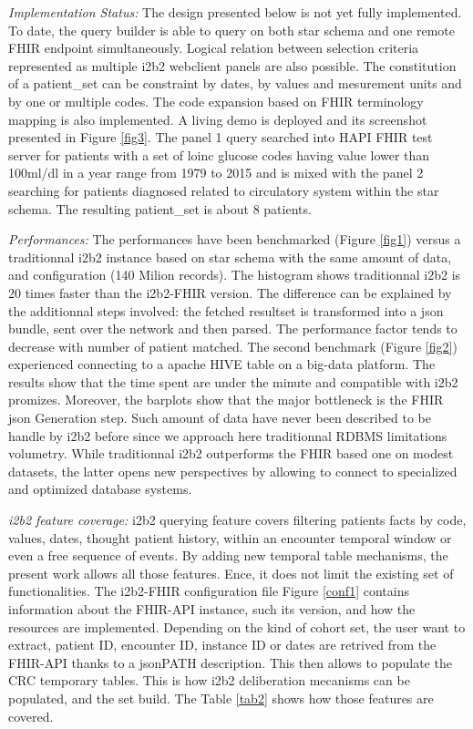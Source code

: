 \documentclass{amia}
\begin{document}
\textit{Implementation Status: } The design presented below is not yet fully implemented. To date, the query builder is able to query on both star schema and one remote FHIR endpoint simultaneously. Logical relation between selection criteria represented as multiple i2b2 webclient panels are also possible. The constitution of a patient\_set can be constraint by dates, by values and mesurement units and by one or multiple codes. The code expansion based on FHIR terminology mapping is also implemented. A living demo is deployed\cite{ref16}  and its screenshot presented in Figure \ref{fig3}. The panel 1 query searched into HAPI FHIR test server for patients with a set of loinc glucose codes having value lower than 100ml/dl in a year range from 1979 to 2015 and is mixed with the panel 2 searching for patients diagnosed related to circulatory system within the star schema. The resulting patient\_set is about 8 patients.

\textit{Performances: } The performances have been benchmarked (Figure \ref{fig1}) versus a traditionnal i2b2 instance based on star schema with the same amount of data, and configuration (140 Milion records). The histogram shows traditionnal i2b2 is 20 times faster than the i2b2-FHIR version. The difference can be explained by the additionnal steps involved: the fetched resultset is transformed into a json bundle, sent over the network and then parsed. The performance factor tends to decrease with number of patient matched. The second benchmark (Figure \ref{fig2}) experienced connecting to a apache HIVE table on a big-data platform. The results show that the time spent are under the minute and compatible with i2b2 promizes. Moreover, the barplots show that the major bottleneck is the FHIR json Generation step. Such amount of data have never been described to be handle by i2b2 before since we approach here traditionnal RDBMS limitations volumetry. While traditionnal i2b2 outperforms the FHIR based one on modest datasets, the latter opens new perspectives by allowing to connect to specialized and optimized database systems.


\textit{i2b2 feature coverage: }i2b2 querying feature covers filtering patients facts by code, values, dates, thought patient history, within an encounter temporal window or even a free sequence of events. By adding new temporal table mechanisms, the present work allows all those features. Ence, it does not limit the existing set of functionalities. The i2b2-FHIR configuration file Figure \ref{conf1} contains information about the FHIR-API instance, such its version, and how the resources are implemented. Depending on the kind of cohort set, the user want to extract, patient ID, encounter ID, instance ID or dates are retrived from the FHIR-API thanks to a jsonPATH description. This then allows to populate the CRC temporary tables. This is how i2b2 deliberation mecanisms can be populated, and the set build. The Table \ref{tab2} shows how those features are covered.
\end{document}
